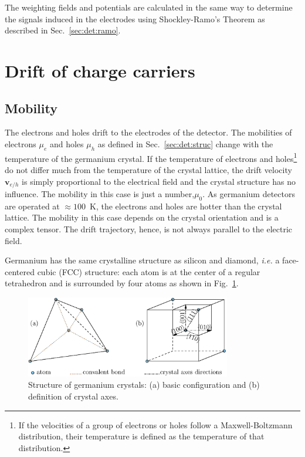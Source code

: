 The weighting fields and potentials are calculated in the same way to
determine the signals induced in the electrodes using Shockley-Ramo's
Theorem \cite{Gat82, Rad88, He00} as described in
Sec.~\ref{sec:det:ramo}.
 
 
\section{Drift of charge carriers} 
\label{sec:pss:drift} 
 
\subsection{Mobility} 
\label{sec:pss:mobi} 
The electrons and holes drift to the electrodes of the detector. The
mobilities of electrons $\mu_{e}$ and holes $\mu_{h}$ as defined in
Sec.~\ref{sec:det:struc} change with the temperature of the germanium
crystal. If the temperature of electrons and holes\footnote{If the
velocities of a group of electrons or holes follow a Maxwell-Boltzmann
distribution, their temperature is defined as the temperature of that
distribution.} do not differ much from the temperature of the crystal
lattice, the drift velocity $\mathbf{v}_{e/h}$ is simply proportional
to the electrical field and the crystal structure has no
influence. The mobility in this case is just a number,$\mu_{0}$. As
germanium detectors are operated at $\approx 100$~K, the electrons and
holes are hotter than the crystal lattice. The mobility in this case
depends on the crystal orientation and is a complex tensor. The drift
trajectory, hence, is not always parallel to the electric field.
 
Germanium has the same crystalline structure as silicon and diamond,
\textit{i.e.} a face-centered cubic (FCC) structure: each atom is at
the center of a regular tetrahedron and is surrounded by four atoms as
shown in Fig.~\ref{fig:pss:xtal}.
 
\begin{figure}[tbhp] 
\centering 
\includegraphics[width=0.8\textwidth]{xtalStruc}   
\caption{Structure of germanium crystals: (a) basic configuration and
(b) definition of crystal axes.}
\label{fig:pss:xtal} 
\end{figure} 
 
